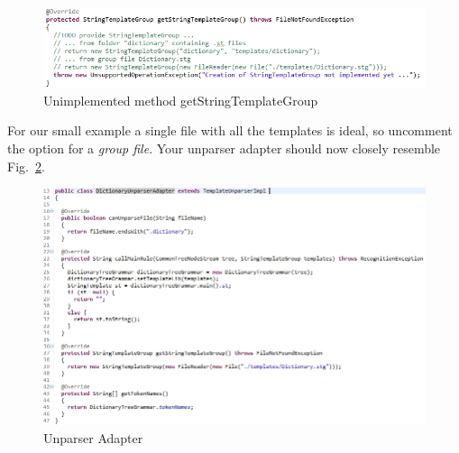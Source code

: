 \begin{enumerate}
\begin{figure}[!htbp]
\begin{center}
 \includegraphics[width=\textwidth]{pics/moca/5MocaTreeToText/UnparserAdapterNotImplemented}
  \caption{Unimplemented method getStringTemplateGroup} 
  \label{fig:moca-DictionaryUnparserAdapter}
\end{center}
\end{figure} 

For our small example a single file with all the templates is ideal, so uncomment the option for a \emph{group file}.
Your unparser adapter should now closely resemble Fig.~\ref{fig:moca-DictionaryUnparserAdapter}.  
 
\begin{figure}[!htbp]
\begin{center}
 \includegraphics[width=\textwidth]{pics/moca/5MocaTreeToText/UnparserAdapter}
  \caption{Unparser Adapter} 
  \label{fig:moca-DictionaryUnparserAdapter}
\end{center}
\end{figure} 


\end{enumerate}
